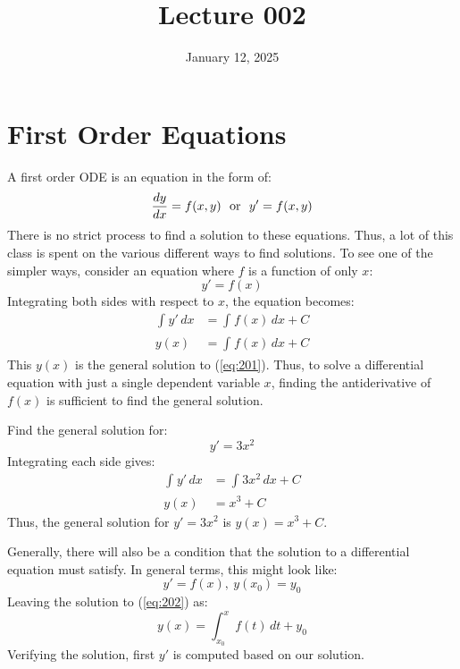 \documentclass[12pt]{article}
\title{Lecture 002}
\date{January 12, 2025}
\begin{document}
\setcounter{equation}{0}
\newpage

\section{First Order Equations}
\label{sec:firstOrderEquations}

A first order ODE is an equation in the form of:
\begin{equation}
  \frac{dy}{dx} = f(x,y) \ \ \textup{or} \ \ y' = f(x,y)
  \label{eq:201}
\end{equation}
There is no strict process to find a solution to these equations. Thus, a lot of this class is spent on the various different ways to find solutions. To see one of the simpler ways, consider an equation where $f$ is a function of only $x$:
\begin{equation*}
  y' = f(x)
\end{equation*}
Integrating both sides with respect to $x$, the equation becomes:
\begin{align*}
  \int_{}^{} y' \, dx &= \int_{}^{} f(x) \, dx + C \\
  y(x) &= \int_{}^{} f(x) \, dx + C
\end{align*}
This $y(x)$ is the general solution to (\ref{eq:201}). Thus, to solve a differential equation with just a single dependent variable $x$, finding the antiderivative of $f(x)$ is sufficient to find the general solution.
\begin{example}
  Find the general solution for:
  \begin{equation*}
    y' = 3x^2
  \end{equation*}
  Integrating each side gives:
  \begin{align*}
    \int_{}^{} y' \, dx &= \int_{}^{} 3x^2 \, dx + C \\
    y(x) &= x^3 + C
  \end{align*}
  Thus, the general solution for $y' = 3x^2$ is $y(x) = x^3 + C$.
\end{example}
Generally, there will also be a condition that the solution to a differential equation must satisfy. In general terms, this might look like:
\begin{equation}
  y' = f(x), \ y(x_0) = y_0
  \label{eq:202}
\end{equation}
Leaving the solution to (\ref{eq:202}) as:
\begin{equation*}
  y(x) = \int_{x_0}^{x} f(t) \,dt + y_0
\end{equation*}
Verifying the solution, first $y'$ is computed based on our solution.
\end{document}
